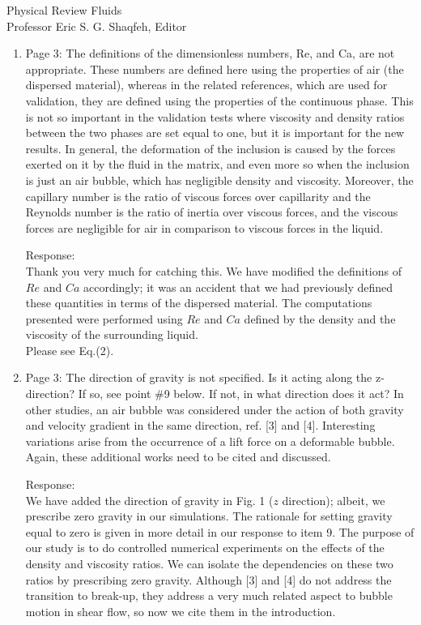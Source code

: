 \documentclass{letter}
\begin{document}
\begin{letter}{
Physical Review Fluids\\
Professor Eric S. G. Shaqfeh, Editor\\}
\begin{enumerate}
\par\noindent
\item
\textsf
{Page 3: The definitions of the dimensionless numbers, Re, and Ca, are not
appropriate.  These numbers are defined here using the properties of air (the
dispersed material), whereas in the related references, which are used for
validation, they are defined using the properties of the continuous phase.
This is not so important in the validation tests where viscosity and density
ratios between the two phases are set equal to one, but it is important for the
new results. In general, the deformation of the inclusion is caused by the
forces exerted on it by the fluid in the matrix, and even more so when the
inclusion is just an air bubble, which has negligible density and viscosity.
Moreover, the capillary number is the ratio of viscous forces over capillarity
and the Reynolds number is the ratio of inertia over viscous forces, and the
viscous forces are negligible for air in comparison to viscous forces in the
liquid.}
\vspace{3 mm}

Response: \\
Thank you very much for catching this.  We have modified the definitions of
$Re$ and $Ca$ accordingly; it was an accident that we had previously 
defined these quantities in terms of the dispersed material.
The computations presented were performed using $Re$ and $Ca$ defined by the
density and the viscosity of the surrounding liquid.
\\
Please see Eq.(2).
\\

\par\noindent
\item
\textsf
{Page 3: The direction of gravity is not specified. Is it acting along the
z-direction? If so, see point \#9 below.  If not, in what direction does it
act? In other studies, an air bubble was considered under the action of both
gravity and velocity gradient in the same direction, ref. [3] and [4].
Interesting variations arise from the occurrence of a lift force on a
deformable bubble. Again, these additional works need to be cited and
discussed.}
\vspace{3 mm}

Response: \\
We have added the direction of gravity in Fig. 1 ($z$ direction);
albeit, we prescribe zero gravity in our simulations.  The rationale
for setting gravity equal to zero is given in more detail in our response
to item 9.  The purpose of our study is to do controlled
numerical experiments on the effects of the density and 
viscosity ratios.  We can isolate
the dependencies on these two ratios by prescribing zero gravity.  Although
[3] and [4] do not address the transition to break-up, they address a very
much related aspect to bubble motion in shear flow, so now we cite them in
the introduction.
\\


\end{enumerate}
\end{letter}
\end{document}
